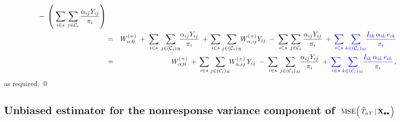 \begin{enumerate}
\begin{eqnarray*}
        \; - \;
        \left(\;
            \underset{i \in s}{\sum}\;
            \underset{j \in \mathcal{C}_{i}}{\sum}\,
            \dfrac{\alpha_{ij}Y_{ij}}{\pi_{i}}
            \right)
    \\
    & = &
        W^{(+)}_{\alpha,0}
        \; + \;
            \underset{i \in {\color{black}s}}{\sum}\;
            \underset{j \in (\mathcal{C}_{i})_{R}}{\sum}\!
            \dfrac{
                \alpha_{ij}Y_{ij}
                }{
                \pi_{i}
                }
            \; + \,
            \underset{i \in {\color{black}s}}{\sum}\,
            \underset{j \in (\mathcal{C}_{i})_{R}}{\sum}\!
            W^{(+)}_{\alpha,ij}Y_{ij}
        \; - \;
        \underset{i \in s}{\sum}\;
        \underset{j \in \mathcal{C}_{i}}{\sum}\,
        \dfrac{\alpha_{ij}Y_{ij}}{\pi_{i}}
        {\color{blue}
        \;\, + \;\,
        \underset{i \in {\color{black}s}}{\sum}\,
        \underset{k \in (\mathcal{C}_{i})_{M}}{\sum}\!
        \dfrac{I_{ik}\,\alpha_{ik}\,e_{ik}}{\pi_{i}}
        }
    \\
    & = &
        W^{(+)}_{\alpha,0}
        \; + \,
        \underset{i \in {\color{black}s}}{\sum}\,
        \underset{j \in (\mathcal{C}_{i})_{R}}{\sum}\!
        W^{(+)}_{\alpha,ij}\,Y_{ij}
        \; - \;
        \underset{i \in {\color{black}s}}{\sum}\;
        \underset{j \in (\mathcal{C}_{i})_{M}}{\sum}\!
        \dfrac{ \alpha_{ij}Y_{ij} }{ \pi_{i} }
        {\color{blue}
        \;\, + \;\,
        \underset{i \in {\color{black}s}}{\sum}\,
        \underset{k \in (\mathcal{C}_{i})_{M}}{\sum}\!
        \dfrac{I_{ik}\,\alpha_{ik}\,e_{ik}}{\pi_{i}}
        }\,,
    \end{eqnarray*}
    as required.
    \qed
\end{enumerate}


\vskip 1.0cm
\subsection{Unbiased estimator for the nonresponse variance component of
\,$\textnormal{MSE}\!\left(\,\widetilde{T}_{\alpha Y}\left\vert\,\mathbf{X}_{\bullet\bullet}\right.\right)$}
\setcounter{theorem}{0}


